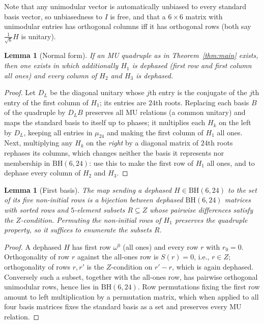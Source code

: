 \documentclass[11pt]{article}
\newtheorem{lemma}[theorem]{Lemma}
\theoremstyle{remark}
\begin{document}
Note that any unimodular vector is automatically unbiased to every
standard basis vector, so unbiasedness to $I$ is free, and that a
$6\times 6$ matrix with unimodular entries has orthogonal columns iff
it has orthogonal rows (both say $\tfrac{1}{\sqrt6}H$ is unitary).

\begin{lemma}[Normal form]\label{lem:normal}
If an MU quadruple as in Theorem~\ref{thm:main} exists, then one exists
in which additionally $H_1$ is dephased (first row and first column all
ones) and every column of $H_2$ and $H_3$ is dephased.
\end{lemma}

\begin{proof}
Let $D_L$ be the diagonal unitary whose $j$th entry is the conjugate of
the $j$th entry of the first column of $H_1$; its entries are $24$th
roots. Replacing each basis $B$ of the quadruple by $D_L B$ preserves
all MU relations (a common unitary) and maps the standard basis to
itself up to phases; it multiplies each $H_k$ on the left by $D_L$,
keeping all entries in $\mu_{24}$ and making the first column of $H_1$
all ones. Next, multiplying any $H_k$ on the \emph{right} by a diagonal
matrix of $24$th roots rephases its columns, which changes neither the
basis it represents nor membership in $\mathrm{BH}(6,24)$: use this to
make the first row of $H_1$ all ones, and to dephase every column of
$H_2$ and $H_3$.
\end{proof}

\begin{lemma}[First basis]\label{lem:first}
The map sending a dephased $H \in \mathrm{BH}(6,24)$ to the set of its
five non-initial rows is a bijection between dephased
$\mathrm{BH}(6,24)$ matrices with sorted rows and $5$-element subsets
$R \subseteq Z$ whose pairwise differences satisfy the $Z$-condition.
Permuting the non-initial rows of $H_1$ preserves the quadruple
property, so it suffices to enumerate the subsets $R$.
\end{lemma}

\begin{proof}
A dephased $H$ has first row $\omega^0$ (all ones) and every row
$r$ with $r_0 = 0$. Orthogonality of row $r$ against the all-ones row
is $S(r) = 0$, i.e., $r \in Z$; orthogonality of rows $r, r'$ is the
$Z$-condition on $r' - r$, which is again dephased. Conversely such a
subset, together with the all-ones row, has pairwise orthogonal
unimodular rows, hence lies in $\mathrm{BH}(6,24)$. Row permutations
fixing the first row amount to left multiplication by a permutation
matrix, which when applied to all four basis matrices fixes the
standard basis as a set and preserves every MU relation.
\end{proof}
\end{document}
